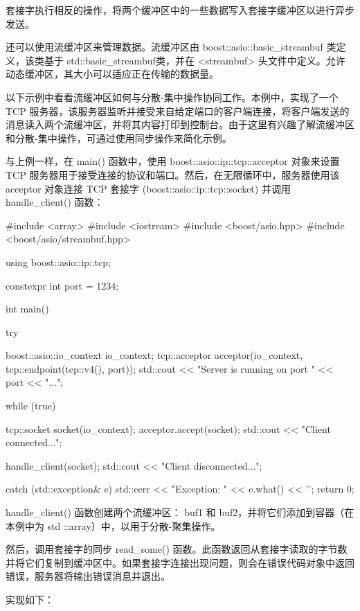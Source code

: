 套接字执行相反的操作，将两个缓冲区中的一些数据写入套接字缓冲区以进行异步发送。


还可以使用流缓冲区来管理数据。流缓冲区由 boost::asio::basic\_streambuf 类定义，该类基于 std::basic\_streambuf类，并在 <streambuf> 头文件中定义。允许动态缓冲区，其大小可以适应正在传输的数据量。

以下示例中看看流缓冲区如何与分散-集中操作协同工作。本例中，实现了一个 TCP 服务器，该服务器监听并接受来自给定端口的客户端连接，将客户端发送的消息读入两个流缓冲区，并将其内容打印到控制台。由于这里有兴趣了解流缓冲区和分散-集中操作，可通过使用同步操作来简化示例。

与上例一样，在 main() 函数中，使用 boost::asio::ip::tcp::acceptor 对象来设置 TCP 服务器用于接受连接的协议和端口。然后，在无限循环中，服务器使用该 acceptor 对象连接 TCP 套接字 (boost::asio::ip::tcp::socket) 并调用 handle\_client() 函数：

\begin{cpp}
#include <array>
#include <iostream>
#include <boost/asio.hpp>
#include <boost/asio/streambuf.hpp>

using boost::asio::ip::tcp;

constexpr int port = 1234;

int main() {
    try {
        boost::asio::io_context io_context;
        tcp::acceptor acceptor(io_context,
                        tcp::endpoint(tcp::v4(), port));
        std::cout << "Server is running on port "
                  << port << "...\n";

        while (true) {
            tcp::socket socket(io_context);
            acceptor.accept(socket);
            std::cout << "Client connected...\n";

            handle_client(socket);
            std::cout << "Client disconnected...\n";
        }
    } catch (std::exception& e) {
        std::cerr << "Exception: " << e.what() << '\n';
    }
    return 0;
}
\end{cpp}

handle\_client() 函数创建两个流缓冲区： buf1 和 buf2，并将它们添加到容器（在本例中为 std ::array）中，以用于分散-聚集操作。

然后，调用套接字的同步 read\_some() 函数。此函数返回从套接字读取的字节数并将它们复制到缓冲区中。如果套接字连接出现问题，则会在错误代码对象中返回错误，服务器将输出错误消息并退出。

实现如下：

